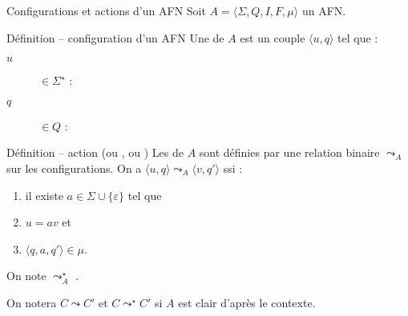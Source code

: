 
\begingroup


\begin{frame}{Configurations et actions d'un AFN}
  Soit $A=\langle \Sigma, Q, I, F, \mu \rangle$ un AFN. 
  
  \begin{block}{Définition -- configuration d'un AFN}
    Une  de $A$ est un couple \alert{$\langle u, q \rangle$} tel que :
    \begin{description}
    \item[\alert{$u$}] $\in \Sigma^\star$ : 
    \item[\alert{$q$}] $\in Q$ : 
    \end{description}
  \end{block}

  \begin{block}{Définition -- action (ou , ou )}
    Les   de $A$ sont définies par une
    relation binaire \alert{$\leadsto_A$} sur les configurations.
    On a \alert{$\langle u, q\rangle \leadsto_A \langle v, q'\rangle$} ssi :
    \begin{enumerate}
    \item il existe \alert{$a \in \Sigma\cup\{\varepsilon\}$} tel que
    \item \alert{$u=a v$} et
    \item \alert{$\langle q, a, q' \rangle \in \mu$}.
    \end{enumerate}
    On note \alert{$\leadsto_A^\star$} .
    
    \vspace{1mm}On notera \alert{$C \leadsto C'$} et \alert{$C \leadsto^\star C'$} si $A$ est clair d'après le contexte.
  \end{block}
\end{frame}

\endgroup
